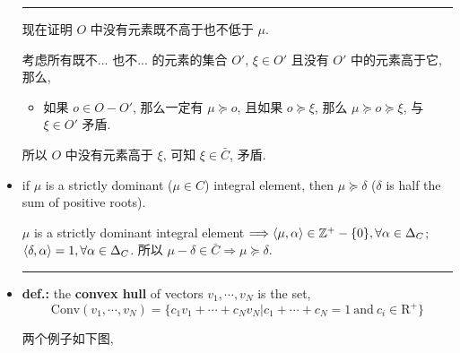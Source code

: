\begin{itemize}
\begin{tcolorbox}[title=proof:]
		\noindent\rule[0.5ex]{\linewidth}{0.5pt} %
		
		现在证明 $O$ 中没有元素既不高于也不低于 $\mu$.
		
		考虑所有既不... 也不... 的元素的集合 $O'$, $\xi \in O'$ 且没有 $O'$ 中的元素高于它, 那么,
		\begin{itemize}
			\item 如果 $o \in O - O'$, 那么一定有 $\mu \succeq o$, 且如果 $o \succeq \xi$, 那么 $\mu \succeq o \succeq \xi$, 与 $\xi \in O'$ 矛盾.
		\end{itemize}
		所以 $O$ 中没有元素高于 $\xi$, 可知 $\xi \in \bar{C}$, 矛盾.
	\end{tcolorbox}
	
	\item if $\mu$ is a strictly dominant ($\mu \in C$) integral element, then $\mu \succeq \delta$ ($\delta$ is half the sum of positive roots).
	
	\begin{tcolorbox}[title=proof:]
		$\mu$ is a strictly dominant integral element $\Longrightarrow \braket{\mu, \alpha} \in \mathbb{Z}^+ - \{0\}, \forall \alpha \in \Delta_C$; $\braket{\delta, \alpha} = 1, \forall \alpha \in \Delta_C$. 所以 $\mu - \delta \in \bar{C} \Longrightarrow \mu \succeq \delta$.
	\end{tcolorbox}
	
	\noindent\rule[0.5ex]{\linewidth}{0.5pt} %
	
	\item \textbf{def.:} the \textbf{convex hull} of vectors $v_1, \cdots, v_N$ is the set,
	\begin{equation}
		\mathrm{Conv}(v_1, \cdots, v_N) = \{c_1 v_1 + \cdots + c_N v_N | c_1 + \cdots + c_N = 1 \ \text{and} \ c_i \in \mathrm{R}^+\}
	\end{equation}
	
	两个例子如下图,
	

\end{itemize}
